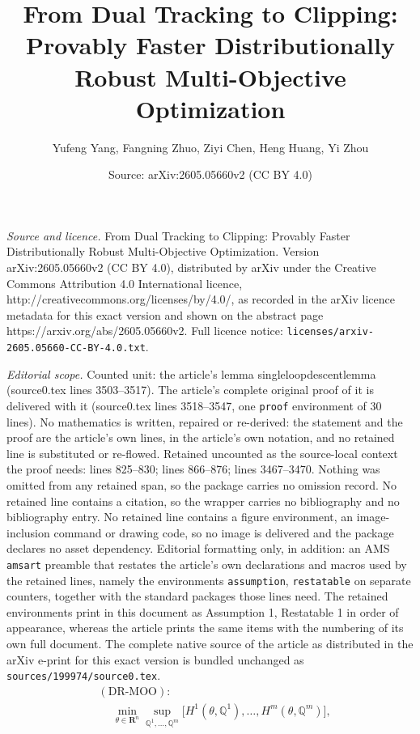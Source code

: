 \documentclass[10pt,a4paper]{amsart}
\title{From Dual Tracking to Clipping: Provably Faster Distributionally Robust Multi-Objective Optimization}
\author{Yufeng Yang, Fangning Zhuo, Ziyi Chen, Heng Huang, Yi Zhou}
\date{Source: arXiv:2605.05660v2 (CC BY 4.0)}
\begin{document}
\maketitle

\noindent\emph{Source and licence.} From Dual Tracking to Clipping: Provably Faster Distributionally Robust Multi-Objective Optimization. Version arXiv:2605.05660v2 (CC BY 4.0), distributed by arXiv under the Creative Commons Attribution 4.0 International licence, http://creativecommons.org/licenses/by/4.0/, as recorded in the arXiv licence metadata for this exact version and shown on the abstract page https://arxiv.org/abs/2605.05660v2. Full licence notice: \texttt{licenses/arxiv-2605.05660-CC-BY-4.0.txt}.\par\smallskip

\noindent\textit{Editorial scope.} Counted unit: the article's lemma singleloopdescentlemma (source0.tex lines 3503--3517). The article's complete original proof of it is delivered with it (source0.tex lines 3518--3547, one \texttt{proof} environment of 30 lines). No mathematics is written, repaired or re-derived: the statement and the proof are the article's own lines, in the article's own notation, and no retained line is substituted or re-flowed.  Retained uncounted as the source-local context the proof needs: lines 825--830; lines 866--876; lines 3467--3470.  Nothing was omitted from any retained span, so the package carries no omission record.  No retained line contains a citation, so the wrapper carries no bibliography and no bibliography entry.  No retained line contains a figure environment, an image-inclusion command or drawing code, so no image is delivered and the package declares no asset dependency.  Editorial formatting only, in addition: an AMS \texttt{amsart} preamble that restates the article's own declarations and macros used by the retained lines, namely the environments \texttt{assumption}, \texttt{restatable} on separate counters, together with the standard packages those lines need.  The retained environments print in this document as Assumption 1, Restatable 1 in order of appearance, whereas the article prints the same items with the numbering of its own full document.  The complete native source of the article as distributed in the arXiv e-print for this exact version is bundled unchanged as \texttt{sources/199974/source0.tex}.
\begin{align}
   &(\text{DR-MOO}):\nonumber\\
   &\quad~\min_{{\theta} \in \mathbf{R}^n} \sup_{\mathbb{Q}^1,\ldots,\mathbb{Q}^m} 
   \big[ H^1({\theta},\mathbb{Q}^1), \ldots, H^m({\theta},\mathbb{Q}^m)\big],
\label{eq: primal DR-MOO}
\end{align}
\end{document}
